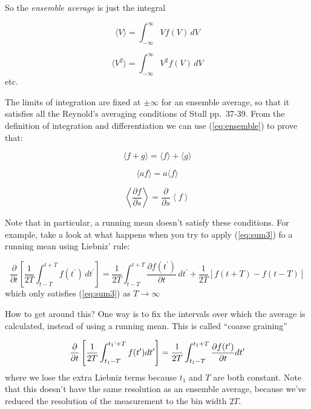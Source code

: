\documentclass[12pt]{article}
\begin{document}
So the \textit{ensemble average} is just the integral

\begin{equation}
  \label{eq:ensemble}
  \langle V \rangle = \int_{ -\infty}^{\infty} V f(V) \!\,dV
\end{equation}

\begin{equation}
  \label{eq:ensemble2}
  \langle V^2 \rangle = \int_{ -\infty}^{\infty} V^2 f(V) \!\,dV
\end{equation}
etc.

The limits of integration are fixed at $\pm \infty$
for an ensemble average, so that it satisfies all the Reynold's averaging conditions of
Stull pp.~37-39.  From the definition of integration and differentiation
we can use (\ref{eq:ensemble}) to prove that:

\begin{equation}
  \label{eq:sum}
  \langle f + g \rangle = \langle f \rangle + \langle g \rangle
\end{equation}

\begin{equation}
  \label{eq:sum2}
  \langle a f \rangle = a \langle f \rangle
\end{equation}

\begin{equation}
  \label{eq:sum3}
\left  \langle \frac{\partial f }{\partial s} \right \rangle =  \frac{\partial  }{\partial s} \left  \langle f \right \rangle
\end{equation}


Note that in particular, a running mean doesn't satisfy these conditions.
For example, take a look at what happens when you try to apply
(\ref{eq:sum3}) fo a running mean using Liebniz' rule:

\begin{equation}
  \label{eq:running}
  \frac{ \partial }{ \partial t} \left [ \frac{ 1}{2T} \int_{ t-T}^{t+T} f(t^\prime) \!\,d t^\prime \right ]
=   \frac{ 1}{2T} \int_{ t-T}^{t+T} \frac{\partial f(t^\prime)} {\partial t} \!\,d t^\prime 
+ \frac{ 1}{2T} \left [ f(t+T) -f(t-T) \right ]
\end{equation}
which only satisfies (\ref{eq:sum3}) as $T \rightarrow \infty$



How to get around this?  One way is to fix the intervals over which the average is calculated, instead of
using a running mean.  This is called ``coarse graining''  

\begin{equation}
  \label{eq:coarse}
  \frac{ \partial }{ \partial t} \left [ \frac{ 1}{2T} \int_{ t_1-T}^{t_1`+T} f(t^\prime) \!\,d t^\prime \right ]
=   \frac{ 1}{2T} \int_{ t_1-T}^{t_1+T} \frac{\partial f(t^\prime)} {\partial t} \!\,d t^\prime 
\end{equation}
where we lose the extra Liebniz terms because $t_1$ and $T$ are both constant.  Note that this doesn't have the
same resolution as an ensemble average, because we've reduced the resolution of the measurement to the bin width
$2T$.
\end{document}
